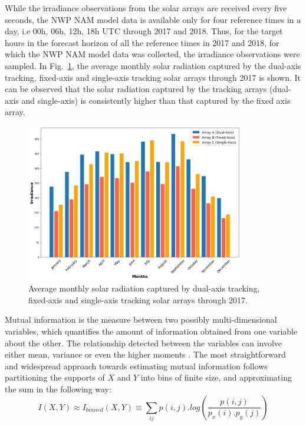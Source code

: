 \par While the irradiance observations from the solar arrays are received every five seconds, the NWP NAM model data is available only for four reference times in a day, i.e 00h, 06h, 12h, 18h UTC through 2017 and 2018. Thus, for the target hours in the forecast horizon of all the reference times in 2017 and 2018, for which the NWP NAM model data was collected, the irradiance observations were sampled. In Fig.~\ref{fig:fig_average_irradiance}, the average monthly solar radiation captured by the dual-axis tracking, fixed-axis and single-axis tracking solar arrays through 2017 is shown. It can be observed that the solar radiation captured by the tracking arrays (dual-axis and single-axis) is consistently higher than that captured by the fixed axis array.

\begin{figure}[ht]
    \begin{center}
    	\includegraphics[width=0.85\textwidth]{chapter3/fig_average_irradiance.png}
    	\caption[Average monthly solar radiation captured by dual-axis tracking, fixed-axis and single-axis tracking solar arrays through 2017.]{Average monthly solar radiation captured by dual-axis tracking, fixed-axis and single-axis tracking solar arrays through 2017.}
    	\label{fig:fig_average_irradiance}
    \end{center}
\end{figure}

\par Mutual information is the measure between two possibly multi-dimensional variables, which quantifies the amount of information obtained from one variable about the other. The relationship detected between the variables can involve either mean, variance or even the higher moments \cite{feature_selection_mi}. The most straightforward and widespread approach towards estimating mutual information follows partitioning the supports of $X$ and $Y$ into bins of finite size, and approximating the sum in the following way:
\begin{equation}\label{eq:eq_mi}
I(X, Y) \approx I_{binned}(X, Y) \equiv \sum_{ij} p(i, j) . log(\frac{p(i, j)}{p_x(i).p_y(j)})
\end{equation}


